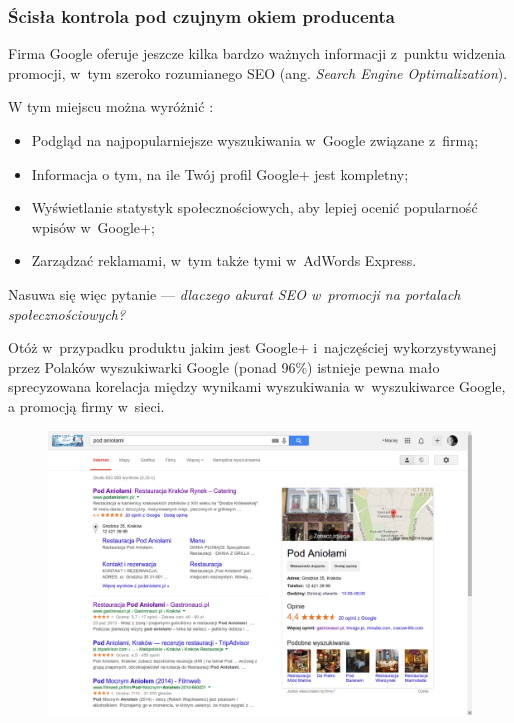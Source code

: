 \subsubsection{Ścisła kontrola pod czujnym okiem producenta}
Firma Google oferuje jeszcze kilka bardzo ważnych informacji z~punktu widzenia promocji, w~tym szeroko rozumianego SEO (ang. \textit{Search Engine Optimalization}).

W tym miejscu można wyróżnić \cite{url:google-plus-firmy-panel-google}: 

\begin{itemize}
\item Podgląd na najpopularniejsze wyszukiwania w~Google związane z~firmą;
\item Informacja o tym, na ile Twój profil Google+ jest kompletny;
\item Wyświetlanie statystyk społecznościowych, aby lepiej ocenić popularność wpisów w~Google+;
\item Zarządzać reklamami, w~tym także tymi w~AdWords Express.
\end{itemize}

Nasuwa się więc pytanie --- \emph{dlaczego akurat SEO w~promocji na portalach społecznościowych?}

Otóż w~przypadku produktu jakim jest Google+ i~najczęściej wykorzystywanej przez Polaków wyszukiwarki Google (ponad 96\%) istnieje pewna mało sprecyzowana korelacja między wynikami wyszukiwania w~wyszukiwarce Google, a promocją firmy w~sieci. 

\begin{figure}[!h]
\centering
    \scalebox{0.32}
    {
        \includegraphics{images/search-result-company-in-google-search-engine.png}
    }
    \label{fig:search-result-company-in-google-search-engine}
\end{figure}

